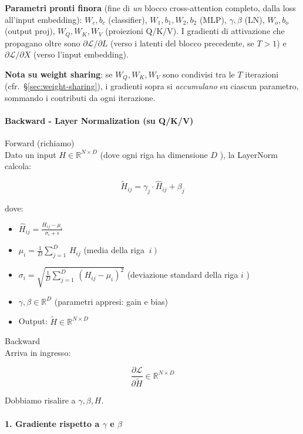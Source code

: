 \documentclass[
  11pt,
]{article}
\begin{document}
\begin{notabox}[title={\textbf{Checkpoint gradienti --- fine proiezioni lineari Q/K/V backward}}]
\medskip
\textbf{Parametri pronti finora} (fine di \emph{un} blocco cross-attention completo, dalla loss all'input embedding): $W_c, b_c$ (classifier), $W_1, b_1, W_2, b_2$ (MLP), $\gamma, \beta$ (LN), $W_o, b_o$ (output proj), $W_Q, W_K, W_V$ (proiezioni Q/K/V). I gradienti di attivazione che propagano oltre sono $\partial\mathcal{L}/\partial L$ (verso i latenti del blocco precedente, se $T > 1$) e $\partial\mathcal{L}/\partial X$ (verso l'input embedding).

\medskip
\textbf{Nota su weight sharing}: se $W_Q, W_K, W_V$ sono condivisi tra le $T$ iterazioni (cfr.\ \S\ref{sec:weight-sharing}), i gradienti sopra si \emph{accumulano} su ciascun parametro, sommando i contributi da ogni iterazione.
\end{notabox}

\paragraph{Backward - Layer Normalization (su Q/K/V)}
Forward (richiamo)\\
Dato un input \(H \in \mathbb{R}^{N \times D}\) (dove ogni riga ha
dimensione \(D\) ), la LayerNorm calcola:

\[{\widetilde{H}}_{ij} = \gamma_{j} \cdot {\widehat{H}}_{ij} + \beta_{j}\]

dove:

\begin{itemize}
\item
  \({\widehat{H}}_{ij} = \frac{H_{ij} - \mu_{i}}{\sigma_{i} + \epsilon}\)
\item
  \(\mu_{i} = \frac{1}{D}\sum_{j = 1}^{D}\, H_{ij}\) (media
  della riga \(\left. \ i \right)\)
\item
  \(\sigma_{i} = \sqrt{\frac{1}{D}\sum_{j = 1}^{D}\,\left( H_{ij} - \mu_{i} \right)^{2}}\)
  (deviazione standard della riga \(i\) )
\item
  \(\gamma,\beta \in \mathbb{R}^{D}\) (parametri appresi: gain e bias)
\item
  Output: \(\widetilde{H} \in \mathbb{R}^{N \times D}\)
\end{itemize}

Backward\\
Arriva in ingresso:

\[\frac{\partial\mathcal{L}}{\partial\widetilde{H}} \in \mathbb{R}^{N \times D}\]

Dobbiamo risalire a \(\gamma,\beta,H\).

\paragraph{1. Gradiente rispetto a $\gamma$ e $\beta$}
\end{document}
